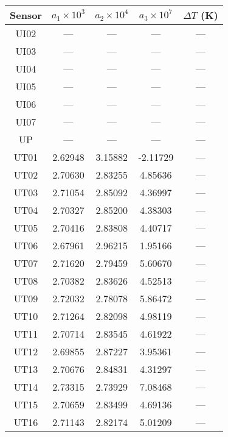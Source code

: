 \documentclass[utf8]{article}
\begin{document}
\begin{table}
{\begin{minipage}{85mm}
      \end{minipage}
      \begin{minipage}{85mm}
        \begin{tabular}{ccccc}
          \hline
          Sensor & $a_1\times10^{3}$ & $a_2\times10^{4}$
                 & $a_3\times10^{7}$ & $\Delta T$ (K) \\
          \hline
          UI02 &   ---   &   ---   &   ---   &     ---   \\
          UI03 &   ---   &   ---   &   ---   &     ---   \\
          UI04 &   ---   &   ---   &   ---   &     ---   \\
          UI05 &   ---   &   ---   &   ---   &     ---   \\
          UI06 &   ---   &   ---   &   ---   &     ---   \\
          UI07 &   ---   &   ---   &   ---   &     ---   \\
          UP   &   ---   &   ---   &   ---   &     ---   \\
          UT01 & 2.62948 & 3.15882 &-2.11729 &     ---   \\
          UT02 & 2.70630 & 2.83255 & 4.85636 &     ---   \\
          UT03 & 2.71054 & 2.85092 & 4.36997 &     ---   \\
          UT04 & 2.70327 & 2.85200 & 4.38303 &     ---   \\
          UT05 & 2.70416 & 2.83808 & 4.40717 &     ---   \\
          UT06 & 2.67961 & 2.96215 & 1.95166 &     ---   \\
          UT07 & 2.71620 & 2.79459 & 5.60670 &     ---   \\
          UT08 & 2.70382 & 2.83626 & 4.52513 &     ---   \\
          UT09 & 2.72032 & 2.78078 & 5.86472 &     ---   \\
          UT10 & 2.71264 & 2.82098 & 4.98119 &     ---   \\
          UT11 & 2.70714 & 2.83545 & 4.61922 &     ---   \\
          UT12 & 2.69855 & 2.87227 & 3.95361 &     ---   \\
          UT13 & 2.70676 & 2.84831 & 4.31297 &     ---   \\
          UT14 & 2.73315 & 2.73929 & 7.08468 &     ---   \\
          UT15 & 2.70659 & 2.83499 & 4.69136 &     ---   \\
          UT16 & 2.71143 & 2.82174 & 5.01209 &     ---   \\
          \hline
        \end{tabular}
      \end{minipage}}
    \end{table}
\end{document}
